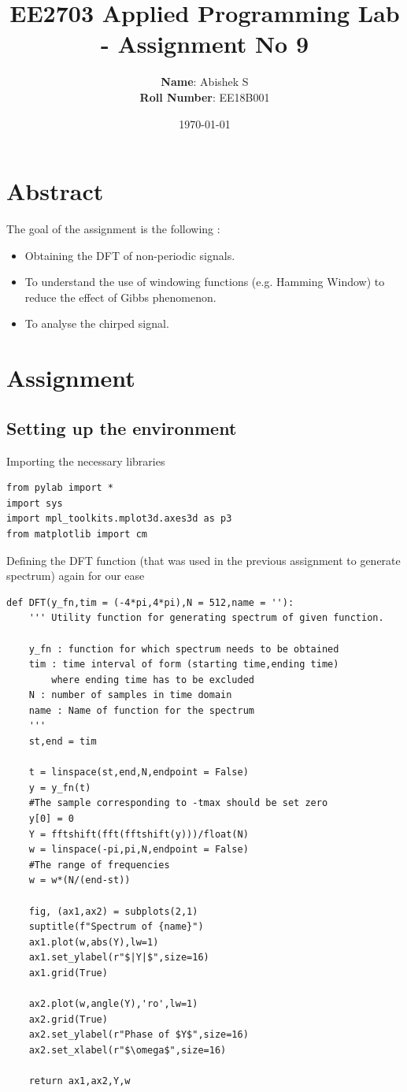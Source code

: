 \documentclass[11pt, a4paper]{article}
\title{EE2703 Applied Programming Lab - Assignment No 9}
\author{
  \textbf{Name}: Abishek S\\
  \textbf{Roll Number}: EE18B001
}\date{\today}
\begin{document}
		
\maketitle 
\section{Abstract}
The goal of the assignment is the following :
\begin{itemize}
\item Obtaining the DFT of non-periodic signals.
\item To understand the use of windowing functions (e.g. Hamming Window) to reduce the effect of Gibbs phenomenon.
\item To analyse the chirped signal.
\end{itemize}


\section{Assignment}
\subsection{Setting up the environment}
Importing the necessary libraries
\begin{verbatim}
from pylab import *
import sys
import mpl_toolkits.mplot3d.axes3d as p3
from matplotlib import cm
\end{verbatim}
Defining the DFT function (that was used in the previous assignment to generate spectrum) again for our ease
\begin{verbatim}
def DFT(y_fn,tim = (-4*pi,4*pi),N = 512,name = ''):
	''' Utility function for generating spectrum of given function.

	y_fn : function for which spectrum needs to be obtained
	tim : time interval of form (starting time,ending time) 
		where ending time has to be excluded
	N : number of samples in time domain
	name : Name of function for the spectrum
	'''
	st,end = tim

	t = linspace(st,end,N,endpoint = False)
	y = y_fn(t)
	#The sample corresponding to -tmax should be set zero
	y[0] = 0 
	Y = fftshift(fft(fftshift(y)))/float(N)
	w = linspace(-pi,pi,N,endpoint = False)
	#The range of frequencies
	w = w*(N/(end-st))

	fig, (ax1,ax2) = subplots(2,1)
	suptitle(f"Spectrum of {name}")
	ax1.plot(w,abs(Y),lw=1)
	ax1.set_ylabel(r"$|Y|$",size=16)
	ax1.grid(True)

	ax2.plot(w,angle(Y),'ro',lw=1)  
	ax2.grid(True)
	ax2.set_ylabel(r"Phase of $Y$",size=16)
	ax2.set_xlabel(r"$\omega$",size=16)

	return ax1,ax2,Y,w
\end{verbatim}
\end{document}

